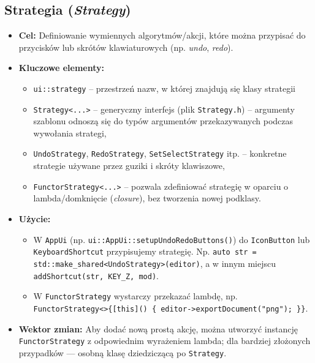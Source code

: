 \documentclass[a4paper,12pt]{article}
\begin{document}
\subsection{Strategia (\emph{Strategy})}
\begin{itemize}
    \item \textbf{Cel:} Definiowanie wymiennych algorytmów/akcji, 
    które można przypisać do przycisków lub skrótów klawiaturowych (np. \emph{undo}, \emph{redo}).
    \item \textbf{Kluczowe elementy:}
    \begin{itemize}
        \item \texttt{ui::strategy} -- przestrzeń nazw, w której znajdują się klasy strategii
        \item \texttt{Strategy<...>} -- generyczny interfejs (plik \texttt{Strategy.h}) 
          -- argumenty szablonu odnoszą się do typów argumentów przekazywanych 
          podczas wywołania strategi, 
        \item \texttt{UndoStrategy}, \texttt{RedoStrategy}, \texttt{SetSelectStrategy} 
        itp. -- konkretne strategie używane przez guziki i skróty klawiszowe,
        \item \texttt{FunctorStrategy<...>} -- pozwala zdefiniować strategię
        w oparciu o lambda/domknięcie (\emph{closure}), bez tworzenia nowej podklasy.
    \end{itemize}
    \item \textbf{Użycie:} 
    \begin{itemize}
      \item W \texttt{AppUi} (np. \verb|ui::AppUi::setupUndoRedoButtons()|)
        do \texttt{IconButton} lub \texttt{KeyboardShortcut} przypisujemy 
       strategię. Np. \texttt{auto str = std::make\_shared<UndoStrategy>(editor)},
       a w innym miejscu \texttt{addShortcut(str, KEY\_Z, mod)}.
       \item W \texttt{FunctorStrategy} wystarczy przekazać lambdę, 
       np. \texttt{FunctorStrategy<>\{[this]() \{ editor->exportDocument("png"); \}\}}.
    \end{itemize}
    \item \textbf{Wektor zmian:} Aby dodać nową prostą akcję, można utworzyć
    instancję \texttt{FunctorStrategy} z odpowiednim wyrażeniem lambda; 
    dla bardziej złożonych przypadków — osobną klasę dziedziczącą po \texttt{Strategy}.
\end{itemize}
\end{document}
